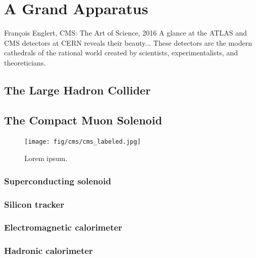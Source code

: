 \chapter{A Grand Apparatus}
\begin{aquote}{Fran\c{c}ois Englert, CMS: The Art of Science, 2016}
    A glance at the ATLAS and CMS detectors at CERN reveals their beauty...
    These detectors are the modern cathedrals of the rational world created by scientists, experimentalists, and theoreticians. 
\end{aquote}
\section{The Large Hadron Collider}
\section{The Compact Muon Solenoid}
\begin{figure}[htb]
    \centering
    \texttt{[image: fig/cms/cms\_labeled.jpg]}
    \caption{
        Lorem ipsum.
    }
    \label{fig:cms_labeled}
\end{figure}
\subsection{Superconducting solenoid}
\subsection{Silicon tracker}
\subsection{Electromagnetic calorimeter}
\subsection{Hadronic calorimeter}
